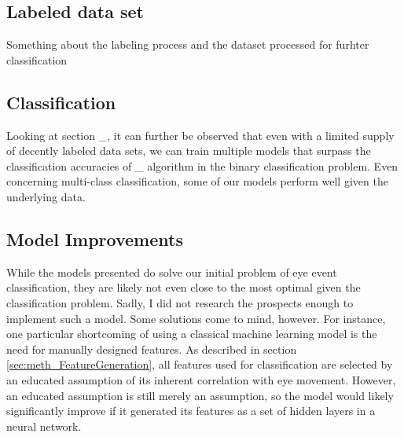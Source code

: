 
\subsection{Labeled data set}

Something about the labeling process and the dataset processed for furhter classification

\subsection{Classification}

Looking at section \_, it can further be observed that even with a limited supply of decently labeled data sets, we can train multiple models that surpass the classification accuracies of \_ algorithm in the binary classification problem. Even concerning multi-class classification, some of our models perform well given the underlying data. 






\subsection{Model Improvements}
While the models presented do solve our initial problem of eye event classification, they are likely not even close to the most optimal given the classification problem. Sadly, I did not research the prospects enough to implement such a model. Some solutions come to mind, however. For instance, one particular shortcoming of using a classical machine learning model is the need for manually designed features. As described in section \ref{sec:meth_FeatureGeneration}, all features used for classification are selected by an educated assumption of its inherent correlation with eye movement. However, an educated assumption is still merely an assumption, so 
the model would likely significantly improve if it generated its features as a set of hidden layers in a neural network.


